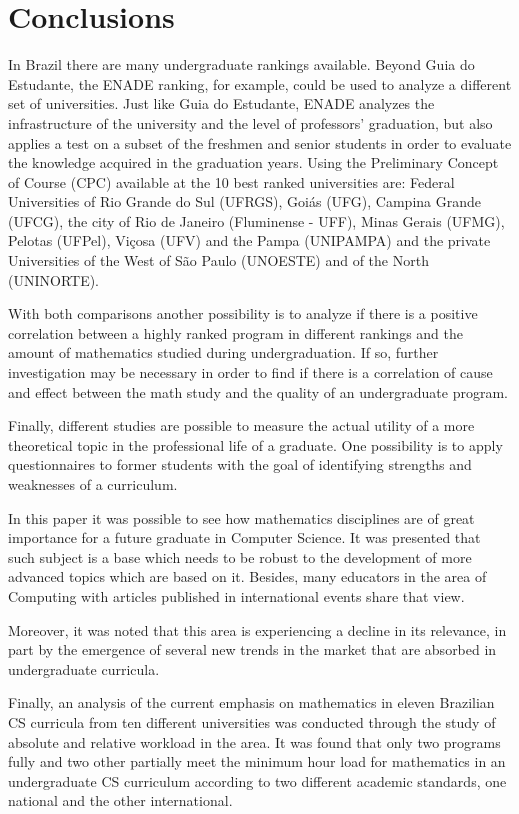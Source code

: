 \documentclass[conference]{IEEEtran}
\begin{document}
\section{Conclusions}
	In Brazil there are many undergraduate rankings available. Beyond Guia do Estudante, the ENADE ranking, for example, could be used to analyze a different set of universities. Just like Guia do Estudante, ENADE analyzes the infrastructure of the university and the level of professors' graduation, but also applies a test on a subset of the freshmen and senior students in order to evaluate the knowledge acquired in the graduation years. \cite{enade_info} Using the Preliminary Concept of Course (CPC) available at \cite{enade} the 10 best ranked universities are: Federal Universities of Rio Grande do Sul (UFRGS), Goiás (UFG), Campina Grande (UFCG), the city of Rio de Janeiro (Fluminense - UFF), Minas Gerais (UFMG), Pelotas (UFPel), Viçosa (UFV) and the Pampa (UNIPAMPA) and the private Universities of the West of São Paulo (UNOESTE) and of the North (UNINORTE). 
	
	With both comparisons another possibility is to analyze if there is a positive correlation between a highly ranked program in different rankings and the amount of mathematics studied during undergraduation. If so, further investigation may be necessary in order to find if there is a correlation of cause and effect between the math study and the quality of an undergraduate program.
	
	Finally, different studies are possible to measure the actual utility of a more theoretical topic in the professional life of a graduate. One possibility is to apply questionnaires to former students with the goal of identifying strengths and weaknesses of a curriculum.


	In this paper it was possible to see how mathematics disciplines are of great importance for a future graduate in Computer Science. It was presented that such subject is a base which needs to be robust to the development of more advanced topics which are based on it. Besides, many educators in the area of Computing with articles published in international events share that view.

	Moreover, it was noted that this area is experiencing a decline in its relevance, in part by the emergence of several new trends in the market that are absorbed in undergraduate curricula.
	
	Finally, an analysis of the current emphasis on mathematics in eleven Brazilian CS curricula from ten different universities was conducted through the study of absolute and relative workload in the area. It was found that only two programs fully and two other partially meet the minimum hour load for mathematics in an undergraduate CS curriculum according to two different academic standards, one national and the other international.
	
\end{document}
